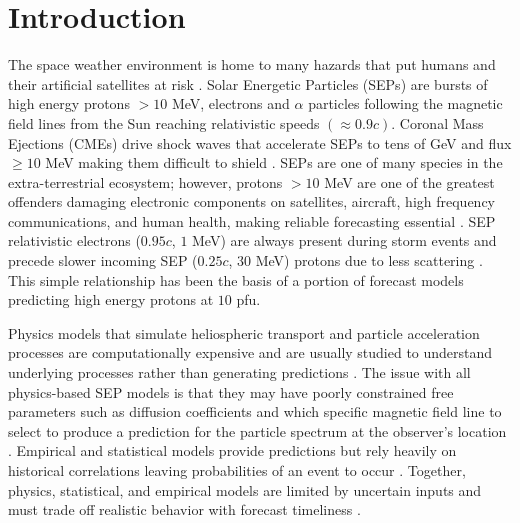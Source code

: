 \section{Introduction}
The space weather environment is home to many hazards that put humans and their artificial satellites at risk \cite{eastwood2017economic}. 
Solar Energetic Particles (SEPs) are bursts of high energy protons $>10$ MeV, electrons and $\alpha$ particles following the magnetic field lines from the Sun reaching relativistic speeds $(\approx 0.9c)$. Coronal Mass Ejections (CMEs) drive shock waves that accelerate SEPs to tens of GeV and flux $\geq 10$ MeV making them difficult to shield \cite{reames2021solar}.
SEPs are one of many species in the extra-terrestrial ecosystem; however, protons $>10$ MeV are one of the greatest offenders damaging electronic components on satellites, aircraft, high frequency communications, and human health, making reliable forecasting essential \cite{eastwood2017economic}.
SEP relativistic  electrons ($0.95c$, $1$ MeV) are always present during storm events and precede slower incoming SEP ($0.25c$, $30$ MeV) protons due to less scattering  \cite{nunez2018hesperia}.
This simple relationship has been the basis of a portion of forecast models predicting high energy protons at $10$ pfu.

Physics models that simulate heliospheric transport and particle acceleration processes are computationally expensive and are usually studied to understand underlying processes rather than generating predictions \cite{Camporeale2019,kasapis2026review}.
The issue with all physics-based SEP models is that they may have poorly constrained free parameters such as diffusion coefficients and which specific magnetic field line to select to produce a prediction for the particle spectrum at the observer's location \cite{whitman2023}.
Empirical and statistical models provide predictions but rely heavily on historical correlations leaving probabilities of an event to occur \cite{whitman2023}. Together, physics, statistical, and empirical models are limited by uncertain inputs and must trade off realistic behavior with forecast timeliness \cite{yu2026}.


